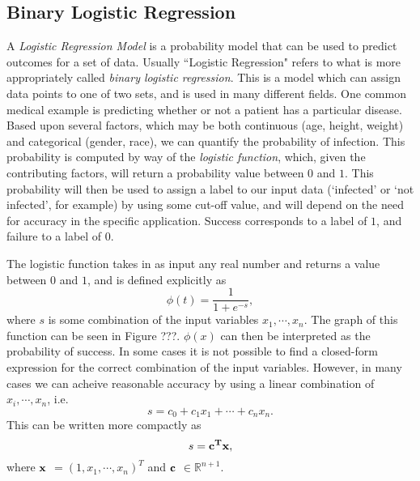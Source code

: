 
\subsection*{Binary Logistic Regression}
A \emph{Logistic Regression Model} is a probability model that can be used to predict outcomes for a set of data.  Usually ``Logistic Regression" refers to what is more appropriately called \emph{binary logistic regression}.  This is a model which can assign data points to one of two sets, and is used in many different fields.  One common medical example is predicting whether or not a patient has a particular disease.  Based upon several factors, which may be both continuous (age, height, weight) and categorical (gender, race), we can quantify the probability of infection.  This probability is computed by way of the \emph{logistic function}, which, given the contributing factors, will return a probability value between $0$ and $1$.  This probability will then be used to assign a label to our input data (`infected' or `not infected', for example) by using some cut-off value, and will depend on the need for accuracy in the specific application.  Success corresponds to a label of $1$, and failure to a label of $0$.

The logistic function takes in as input any real number and returns a value between $0$ and $1$, and is defined explicitly as
\begin{equation}
\phi(t) = \frac{1}{1 + e^{-s}},
\end{equation}
where $s$ is some combination of the input variables $x_1, \cdots, x_n$.  The graph of this function can be seen in Figure ???.   $\phi(x)$ can then be interpreted as the probability of success.  In some cases it is not possible to find a closed-form expression for the correct combination of the input variables.  However, in many cases we can acheive reasonable accuracy by using a linear combination of $x_i, \cdots, x_n$, i.e.
\begin{equation*}
s = c_0 + c_1 x_1 + \cdots + c_n x_n.
\end{equation*}
This can be written more compactly as
\begin{equation*}
s = \bf{c}^{T}\bf{x},
\end{equation*}
where $\bf{x}$ $= (1, x_1, \cdots , x_n)^{T}$ and $\bf{c}$ $\in \mathbb{R}^{n+1}$.

